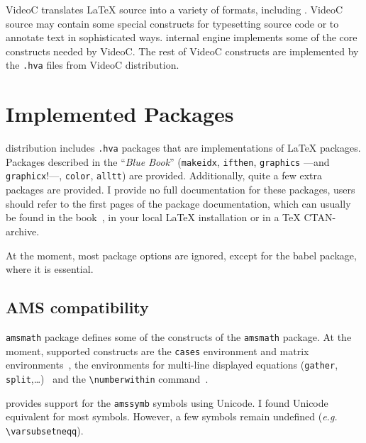 VideoC translates \LaTeX{} source into a variety of formats, including
\html. VideoC source may contain some special constructs for
typesetting source code or to annotate text in sophisticated ways.
\hevea{} internal engine implements some of the core constructs needed
by VideoC. The rest of VideoC constructs are implemented by
the \texttt{.hva} files from VideoC distribution.
\fi

\section{Implemented Packages}\label{implemented:package}
%
\hevea{} distribution includes \texttt{.hva} packages that are
implementations of \LaTeX{} packages.
Packages described in the ``\emph{Blue Book}'' (\texttt{makeidx},
\texttt{ifthen}, \texttt{graphics} ---and \texttt{graphicx}!---,
\texttt{color}, \texttt{alltt}) are provided.  Additionally, quite a
few extra packages are provided.  I provide no full documentation for
these packages, users should refer to the first pages of the package
documentation, which can usually be found in the book~\cite{latexbis},
in your local
\LaTeX{} installation or in a TeX CTAN-archive.

At the moment, most package options are ignored, except for the babel
package, where it is essential.

\subsection{AMS compatibility}
%
\hevea{} \texttt{amsmath} package defines  some of the constructs of the
\texttt{amsmath} package.  At the moment, supported constructs are
the \verb+cases+ environment and matrix
environments~\cite[Section~8.4]{latexbis}, the
environments for multi-line displayed
equations (\verb+gather+,
\verb+split+,\ldots)~\cite[Section~8.5]{latexbis} and the
\verb+\numberwithin+ command~\cite[Section~8.6.2]{latexbis}.

%
\hevea{} provides support for the \texttt{amssymb} symbols using
Unicode. I found Unicode equivalent for most symbols. However, a few symbols
remain undefined (\emph{e.g.} \verb+\varsubsetneqq+).

